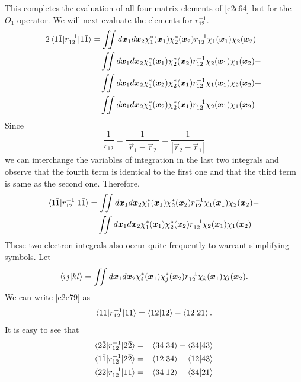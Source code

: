 This completes the evaluation of all four matrix elements of \eqref{c2e64} but
for the $O_1$ operator. We will next evaluate the elements for $r_{12}^{-1}$.
\begin{equation}\label{c2e78}
\begin{aligned}
2\braket{1\bar{1}|r_{12}^{-1}|1\bar{1}} &= \iint d\bm{x}_1d\bm{x}_2
\chi_1^\ast(\bm{x}_1)\chi_2^\ast(\bm{x}_2)r_{12}^{-1}\chi_1(\bm{x}_1)
\chi_2(\bm{x}_2)
- \\
 &\quad \iint d\bm{x}_1d\bm{x}_2
\chi_1^\ast(\bm{x}_1)\chi_2^\ast(\bm{x}_2)r_{12}^{-1}\chi_2(\bm{x}_1)
\chi_1(\bm{x}_2)-
\\
 &\quad  \iint d\bm{x}_1d\bm{x}_2
\chi_1^\ast(\bm{x}_2)\chi_2^\ast(\bm{x}_1)r_{12}^{-1}\chi_1(\bm{x}_1)
\chi_2(\bm{x}_2) +
\\
 &\quad  \iint d\bm{x}_1d\bm{x}_2
\chi_1^\ast(\bm{x}_2)\chi_2^\ast(\bm{x}_1)r_{12}^{-1}\chi_2(\bm{x}_1)
\chi_1(\bm{x}_2)
\end{aligned}
\end{equation}
Since 
\[
\frac{1}{r_{12}} = \frac{1}{|\vec{r}_1 - \vec{r}_2|} = 
\frac{1}{|\vec{r}_2 - \vec{r}_1|}
\]
we can interchange the variables of integration in the last two integrals and
observe that the fourth term is identical to the first one and that the third
term is same as the second one. Therefore,
\begin{equation}\label{c2e79}
\begin{aligned}
\braket{1\bar{1}|r_{12}^{-1}|1\bar{1}} &= \iint d\bm{x}_1d\bm{x}_2
\chi_1^\ast(\bm{x}_1)\chi_2^\ast(\bm{x}_2)r_{12}^{-1}\chi_1(\bm{x}_1)
\chi_2(\bm{x}_2) - \\
 &\quad\iint d\bm{x}_1d\bm{x}_2
\chi_1^\ast(\bm{x}_1)\chi_2^\ast(\bm{x}_2)r_{12}^{-1}\chi_2(\bm{x}_1)
\chi_1(\bm{x}_2)
\end{aligned}
\end{equation}
These two-electron integrals also occur quite frequently to warrant simplifying
symbols. Let
\begin{equation}\label{c2e80}
\braket{ij|kl} = \iint d\bm{x}_1d\bm{x}_2
\chi_i^\ast(\bm{x}_1)\chi_j^\ast(\bm{x}_2)r_{12}^{-1}
\chi_k(\bm{x}_1)\chi_l(\bm{x}_2).
\end{equation}
We can write \eqref{c2e79} as
\begin{equation}\label{c2e81}
\braket{1\bar{1}|r_{12}^{-1}|1\bar{1}} = \braket{12|12} - \braket{12|21}.
\end{equation}
It is easy to see that
\begin{eqnarray}
\braket{2\bar{2}|r_{12}^{-1}|2\bar{2}} &=& \braket{34|34}-\braket{34|43}
\label{c2e82} \\
\braket{1\bar{1}|r_{12}^{-1}|2\bar{2}} &=& \braket{12|34}-\braket{12|43}
\label{c2e83} \\
\braket{2\bar{2}|r_{12}^{-1}|1\bar{1}} &=& \braket{34|12}-\braket{34|21}
\label{c2e84}
\end{eqnarray}
